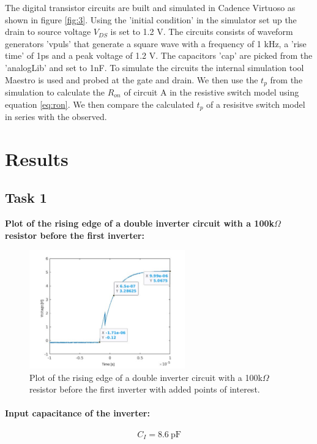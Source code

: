 \documentclass[onecolumn]{article}
\begin{document}
The digital transistor circuits are built and simulated in Cadence Virtuoso as shown in figure \ref*{fig:3}. Using the 'initial condition' in the simulator set up the drain to source voltage $V_{DS}$ is set to 1.2 V. The circuits consists of waveform generators 'vpuls' that generate a square wave with a frequency of 1 kHz, a 'rise time' of 1ps and a peak voltage of 1.2 V. The capacitors 'cap' are picked from the 'analogLib' and set to 1nF. To simulate the circuits the internal simulation tool Maestro is used and probed at the gate and drain. We then use the $t_p$ from the simulation to calculate the $R_{on}$ of circuit A in the resistive switch model using equation \ref{eq:ron}. We then compare the calculated $t_p$ of a resisitve switch model in series with the observed.

\clearpage

\section{Results}
\subsection{Task 1}
\textbf{Plot of the rising edge of a double inverter circuit with a 100k$\Omega$ resistor before the first inverter:}
\begin{figure}[h!]
  \centering
  \includegraphics[width=0.6\textwidth]{plot1.png}
  \caption{Plot of the rising edge of a double inverter circuit with a 100k$\Omega$ resistor before the first inverter with added points of interest.}
  \label{fig:plot}
\end{figure}


\paragraph{Input capacitance of the inverter:}
\begin{equation}
    C_{I} = 8.6 \ \text{pF}
\end{equation}
\end{document}
